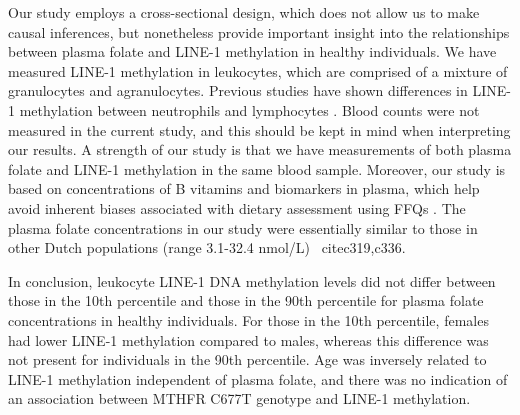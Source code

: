 \noindent Our study employs a cross-sectional design, which does not allow us to make causal inferences, but nonetheless provide important insight into the relationships between plasma folate and LINE-1 methylation in healthy individuals. We have measured LINE-1 methylation in leukocytes, which are comprised of a mixture of granulocytes and agranulocytes. Previous studies have shown differences in LINE-1 methylation between neutrophils and lymphocytes \cite{c310}. Blood counts were not measured in the current study, and this should be kept in mind when interpreting our results. A strength of our study is that we have measurements of both plasma folate and LINE-1 methylation in the same blood sample. Moreover, our study is based on concentrations of B vitamins and biomarkers in plasma, which help avoid inherent biases associated with dietary assessment using FFQs \cite{c320}. The plasma folate concentrations in our study were essentially similar to those in other Dutch populations (range 3.1-32.4 nmol/L) \
cite{c319,c336}.

\noindent In conclusion, leukocyte LINE-1 DNA methylation levels did not differ between those in the 10th percentile and those in the 90th percentile for plasma folate concentrations in healthy individuals. For those in the 10th percentile, females had lower LINE-1 methylation compared to males, whereas this difference was not present for individuals in the 90th percentile. Age was inversely related to LINE-1 methylation independent of plasma folate, and there was no indication of an association between MTHFR C677T genotype and LINE-1 methylation. 
 
